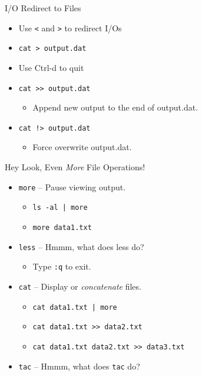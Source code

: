 \documentclass[14pt,aspectratio=1610]{beamer}
\begin{document}
\begin{frame}{I/O Redirect to Files}
\begin{itemize}
\item Use \lstinline{<} and \lstinline{>} to redirect I/Os
\item \lstinline{cat > output.dat}
\item Use Ctrl-d to quit
\item \lstinline{cat >> output.dat}
\begin{itemize}
\item Append new output to the end of output.dat.
\end{itemize}
\item \lstinline{cat !> output.dat}
\begin{itemize}
\item Force overwrite output.dat.
\end{itemize}
\end{itemize}
\end{frame}


\begin{frame}{Hey Look, Even \textit{More} File Operations!}
\begin{itemize}
\item \lstinline{more} -- Pause viewing output.
\begin{itemize}
  \item \lstinline{ls -al | more}
  \item \lstinline{more data1.txt}
\end{itemize}
\item \lstinline{less} -- Hmmm, what does less do?
  \begin{itemize}
    \item Type \lstinline{:q} to exit.
  \end{itemize}
\item \lstinline{cat} -- Display or \textit{concatenate} files.
\begin{itemize}
\item \lstinline{cat data1.txt | more}
\item \lstinline{cat data1.txt >> data2.txt}
\item \lstinline{cat data1.txt data2.txt >> data3.txt}
\end{itemize}
\item \lstinline{tac} -- Hmmm, what does \lstinline{tac} do?
\end{itemize}
\end{frame}
\end{document}
